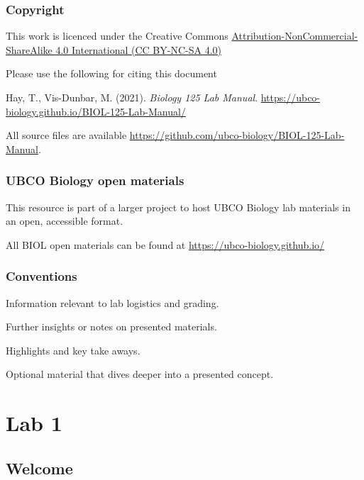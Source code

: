 \documentclass[
]{book}
\begin{document}
\hypertarget{copyright}{%
\section*{Copyright}\label{copyright}}

This work is licenced under the Creative Commons \href{https://creativecommons.org/licenses/by-nc-sa/4.0/}{Attribution-NonCommercial-ShareAlike 4.0 International (CC BY-NC-SA 4.0)}

Please use the following for citing this document

Hay, T., Vis-Dunbar, M. (2021). \emph{Biology 125 Lab Manual}. \url{https://ubco-biology.github.io/BIOL-125-Lab-Manual/}

All source files are available \url{https://github.com/ubco-biology/BIOL-125-Lab-Manual}.

\hypertarget{ubco-biology-open-materials}{%
\section*{UBCO Biology open materials}\label{ubco-biology-open-materials}}

This resource is part of a larger project to host UBCO Biology lab materials in an open, accessible format.

All BIOL open materials can be found at \url{https://ubco-biology.github.io/}

\hypertarget{conventions}{%
\section*{Conventions}\label{conventions}}

Information relevant to lab logistics and grading.

Further insights or notes on presented materials.

Highlights and key take aways.

Optional material that dives deeper into a presented concept.

\hypertarget{part-lab-1}{%
\part*{Lab 1}\label{part-lab-1}}

\hypertarget{welcome-1}{%
\chapter*{Welcome}\label{welcome-1}}
\end{document}
